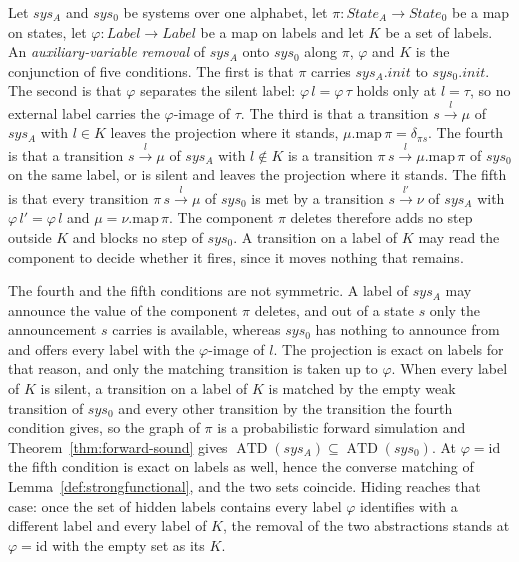 \begin{definition}
  \label{def:auxiliary-variable-removal}
  \leanok
  Let $sys_A$ and $sys_0$ be systems over one alphabet, let $\pi : State_A \to State_0$ be a map on states, let $\varphi : Label \to Label$ be a map on labels and let $K$ be a set of labels.
  An \emph{auxiliary-variable removal} of $sys_A$ onto $sys_0$ along $\pi$, $\varphi$ and $K$ is the conjunction of five conditions.
  The first is that $\pi$ carries $sys_A.init$ to $sys_0.init$.
  The second is that $\varphi$ separates the silent label: $\varphi\,l = \varphi\,\tau$ holds only at $l = \tau$, so no external label carries the $\varphi$-image of $\tau$.
  The third is that a transition $s \xrightarrow{l} \mu$ of $sys_A$ with $l \in K$ leaves the projection where it stands, $\mu.\mathrm{map}\,\pi = \delta_{\pi s}$.
  The fourth is that a transition $s \xrightarrow{l} \mu$ of $sys_A$ with $l \notin K$ is a transition $\pi\,s \xrightarrow{l} \mu.\mathrm{map}\,\pi$ of $sys_0$ on the same label, or is silent and leaves the projection where it stands.
  The fifth is that every transition $\pi\,s \xrightarrow{l} \mu$ of $sys_0$ is met by a transition $s \xrightarrow{l'} \nu$ of $sys_A$ with $\varphi\,l' = \varphi\,l$ and $\mu = \nu.\mathrm{map}\,\pi$.
  The component $\pi$ deletes therefore adds no step outside $K$ and blocks no step of $sys_0$.
  A transition on a label of $K$ may read the component to decide whether it fires, since it moves nothing that remains.

  The fourth and the fifth conditions are not symmetric.
  A label of $sys_A$ may announce the value of the component $\pi$ deletes, and out of a state $s$ only the announcement $s$ carries is available, whereas $sys_0$ has nothing to announce from and offers every label with the $\varphi$-image of $l$.
  The projection is exact on labels for that reason, and only the matching transition is taken up to $\varphi$.
  When every label of $K$ is silent, a transition on a label of $K$ is matched by the empty weak transition of $sys_0$ and every other transition by the transition the fourth condition gives, so the graph of $\pi$ is a probabilistic forward simulation and Theorem~\ref{thm:forward-sound} gives $\operatorname{ATD}(sys_A) \subseteq \operatorname{ATD}(sys_0)$.
  At $\varphi = \mathrm{id}$ the fifth condition is exact on labels as well, hence the converse matching of Lemma~\ref{def:strongfunctional}, and the two sets coincide.
  Hiding reaches that case: once the set of hidden labels contains every label $\varphi$ identifies with a different label and every label of $K$, the removal of the two abstractions stands at $\varphi = \mathrm{id}$ with the empty set as its $K$.


\end{definition}
